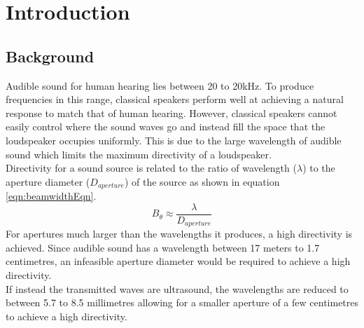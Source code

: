 \section{Introduction}
\subsection{Background}
Audible sound for human hearing lies between 20 to 20kHz. To produce frequencies in this range, classical speakers perform well at achieving a natural response to match that of human hearing. However, classical speakers cannot easily control where the sound waves go and instead fill the space that the loudspeaker occupies uniformly. This is due to the large wavelength of audible sound which limits the maximum directivity of a loudspeaker.\\
Directivity for a sound source is related to the ratio of wavelength ($\lambda$) to the aperture diameter ($D_{aperture}$) of the source as shown in equation \ref{eqn:beamwidthEqn}.
\begin{equation}
    B_\theta \approx \frac{\lambda}{D_{aperture}}
    \label{eqn:beamwidthEqn}
\end{equation}
For apertures much larger than the wavelengths it produces, a high directivity is achieved. Since audible sound has a wavelength between 17 meters to 1.7 centimetres, an infeasible aperture diameter would be required to achieve a high directivity.\\
If instead the transmitted waves are ultrasound, the wavelengths are reduced to between 5.7 to 8.5 millimetres allowing for a smaller aperture of a few centimetres to achieve a high directivity.
